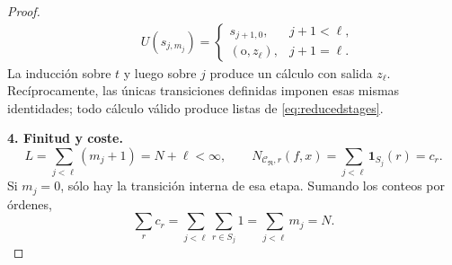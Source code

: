 \documentclass[11pt,a4paper]{article}
\numberwithin{equation}{section}
\theoremstyle{definition}
\theoremstyle{remark}
\newcommand{\paso}[1]{\par\smallskip\noindent\textbf{#1}\quad}
\begin{document}
\begin{proof}
\begin{align*}
&\phantom{\Longrightarrow}U(s_{j,m_j})=
\begin{cases}s_{j+1,0},&j+1<\ell,\\(\mathrm{o},z_\ell),&j+1=\ell.\end{cases}
\end{align*}
La inducción sobre $t$ y luego sobre $j$ produce un cálculo con salida $z_\ell$. Recíprocamente, las únicas transiciones definidas imponen esas mismas identidades; todo cálculo válido produce listas de \eqref{eq:reducedstages}.
\paso{4. Finitud y coste.}
\[
L=\sum_{j<\ell}(m_j+1)=N+\ell<\infty,
\qquad
N_{\mathscr C_{\mathfrak R},r}(f,x)=\sum_{j<\ell}\mathbf1_{S_j}(r)=c_r.
\]
Si $m_j=0$, sólo hay la transición interna de esa etapa. Sumando los conteos por órdenes,
\[
\sum_r c_r=\sum_{j<\ell}\sum_{r\in S_j}1=\sum_{j<\ell}m_j=N.
\]
\end{proof}
\end{document}
